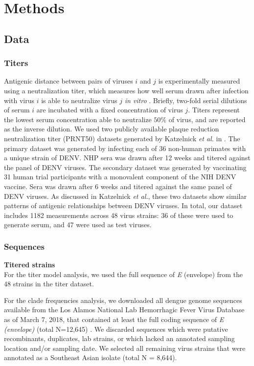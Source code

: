 \documentclass[11pt,oneside,letterpaper]{article}
\begin{document}
\newpage

\section*{Methods}
\subsection*{Data}

\subsubsection{Titers}
Antigenic distance between pairs of viruses $i$ and $j$ is experimentally measured using a neutralization titer, which measures how well serum drawn after infection with virus $i$ is able to neutralize virus $j$ \textit{in vitro} \citep{russell1967dengue}.
Briefly, two-fold serial dilutions of serum $i$ are incubated with a fixed concentration of virus $j$.
Titers represent the lowest serum concentration able to neutralize $50\%$ of virus, and are reported as the inverse dilution.
We used two publicly available plaque reduction neutralization titer (PRNT50) datasets generated by Katzelnick \textit{et al.} in \citep{katzelnick2015dengue}.
The primary dataset was generated by infecting each of 36 non-human primates with a unique strain of DENV.
NHP sera was drawn after 12 weeks and titered against the panel of DENV viruses.
The secondary dataset was generated by vaccinating 31 human trial participants with a monovalent component of the NIH DENV vaccine.
Sera was drawn after 6 weeks and titered against the same panel of DENV viruses.
As discussed in Katzelnick \textit{et al.}, these two datasets show similar patterns of antigenic relationships between DENV viruses.
In total, our dataset includes 1182 measurements across 48 virus strains: 36 of these were used to generate serum, and 47 were used as test viruses.

\subsubsection{Sequences}
\textbf{Titered strains}\\
For the titer model analysis, we used the full sequence of \textit{E} (envelope) from the 48 strains in the titer dataset.

For the clade frequencies analysis, we downloaded all dengue genome sequences available from the Los Alamos National Lab Hemorrhagic Fever Virus Database as of March 7, 2018, that contained at least the full coding sequence of \textit{E (envelope)} (total N=12,645) \citep{kuiken2011lanl}.
We discarded sequences which were putative recombinants, duplicates, lab strains, or which lacked an annotated sampling location and/or sampling date.
We selected all remaining virus strains that were annotated as a Southeast Asian isolate (total N = 8,644).
\end{document}
